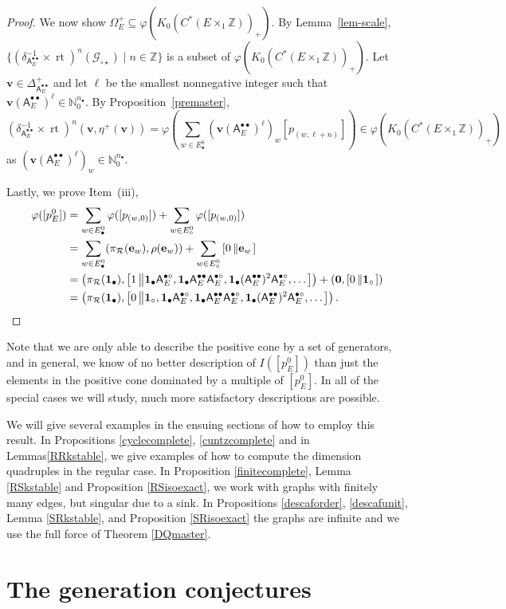 \documentclass[12pt]{amsbook}%
\newcommand{\rt}{\operatorname{rt}}
\newcommand{\ee}{{\mathbf e}}
\renewcommand{\phi}{\varphi}
\theoremstyle{defin}
\theoremstyle{remark}
\numberwithin{equation}{chapter}
\numberwithin{theor}{section}
\newcommand{\NN}{\mathbb{N}}
\newcommand{\ZZ}{\mathbb{Z}}
\newcommand{\singgen}{\mathcal G_{\circ\star}}
\newcommand{\oXe}[2]{\left[#1\left\|{#2}\right.\right]}
\newcommand{\regX}{{\bullet}}
\newcommand{\singX}{{\circ}}
\newcommand{\vv}{\mathbf{v}}
\newcommand{\uu}{\mathbf{1}}
\newcommand{\oo}{{\mathbf 0}}
\newcommand{\nor}{{n_\regX}}
\newcommand{\pK}[1]{\pi_{\mathcal R}(#1)}
\newcommand{\adjRR}{\mathsf{A}^{\bullet\bullet}}
\newcommand{\adjRS}{\mathsf{A}^{\bullet\circ}}
\newcommand{\nDT}{\Omega}
\begin{document}
\begin{proof}
We now show $\nDT_E^+ \subseteq \phi ( K_0( C^*(E \times_1\ZZ))_+)$.  By Lemma~\ref{lem-scale}, $\{(\delta_{\adjRR_E}^{-1}\times \rt)^n(\singgen)\mid n\in\ZZ\}$ is a subset of $\phi ( K_0( C^*(E \times_1\ZZ))_+)$.  Let $\vv \in \Delta_{\adjRR_E}^+$ and let $\ell$ be the smallest nonnegative integer such that $\vv (\adjRR_E)^{\ell} \in \NN_0^\nor$.  By Proposition~\ref{premaster},
$$
(\delta_{\adjRR_E}^{-1} \times \rt)^n (\vv, \eta^+(\vv)) = \phi\left( \sum_{w \in E^0_\regX} (\vv (\adjRR_E)^\ell)_w   [ p_{(w,\ell+n)} ] \right) \in \phi ( K_0( C^*(E \times_1\ZZ))_+)
$$
as $(\vv (\adjRR_E)^\ell)_w  \in \NN_0^\nor$.  

Lastly, we prove Item~(iii),
\begin{align*}
\phi( [p_E^0] ) &= \sum_{w \in E^0_\regX} \phi([ p_{(w,0)} ]) + \sum_{w \in E^0_\singX} \phi([ p_{(w,0)} ]) \\
			&= \sum_{w \in E^0_\regX}  ( \pK{\ee_w} , \rho(\ee_w)) + \sum_{w \in E^0_\singX} \oXe{0}{\ee_w} \\
				&=\left(\pK{\uu_\regX },\oXe{1}{\uu_\regX \adjRS_E, \uu_\regX \adjRR_E \adjRS_E, \uu_\regX (\adjRR_E)^2 \adjRS_E,\dots}\right) + (\oo, \oXe{0}{\uu_\singX})\\
			&=\left(\pK{\uu_\regX },\oXe{0}{\uu_\singX,\uu_\regX \adjRS_E, \uu_\regX \adjRR_E \adjRS_E, \uu_\regX (\adjRR_E)^2 \adjRS_E,\dots}\right). \qedhere
\end{align*}
\end{proof}

Note that we are only able to describe the positive cone by a set of generators, and in general, we know of no better description of $I([p^0_E])$ than just the elements in the positive cone dominated by a multiple of $[p^0_E]$. In all of the special cases we will study, much more satisfactory descriptions are possible.

We will give several examples in the ensuing sections of how to employ this result. In Propositions \ref{cyclecomplete},
\ref{cuntzcomplete} and in Lemmas\ref{RRkstable}, we give examples of how to compute the dimension quadruples in the regular case. In Proposition \ref{finitecomplete}, Lemma \ref{RSkstable} and Proposition \ref{RSisoexact}, we work with graphs with finitely many edges, but singular due to a sink. In Propositions \ref{descaforder}, \ref{descafunit}, Lemma  \ref{SRkstable}, and Proposition \ref{SRisoexact} the graphs are infinite and we use the full force of Theorem \ref{DQmaster}.

\part{The generation conjectures}\label{genpart}
\end{document}
